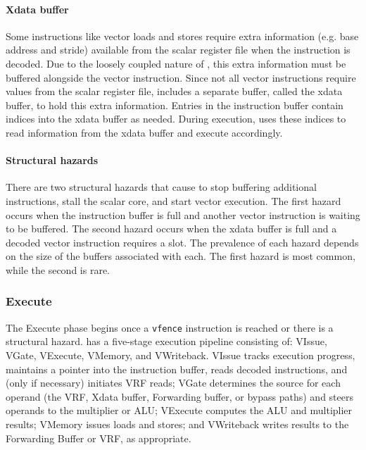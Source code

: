\paragraph{Xdata buffer}
Some instructions like vector loads and stores require extra information 
(e.g. base address and stride) available from the scalar register file when the instruction is decoded.
%
Due to the loosely coupled nature of \manic, this extra information must be buffered 
alongside the vector instruction.
%
Since not all vector instructions require values from the scalar register file, 
\manic includes a separate buffer, called the xdata buffer, to hold this extra
information.
%
Entries in the instruction buffer contain indices into the xdata buffer as needed.
%
During execution, \manic uses these indices to read information from the xdata buffer and execute accordingly.

\paragraph{Structural hazards}
There are two structural hazards that cause \manic to stop buffering additional
instructions, stall the scalar core, and start vector execution. 
%
The first hazard occurs when the instruction buffer is full and another vector instruction is waiting to be buffered.
%
The second hazard occurs when the xdata buffer is full and a decoded 
vector instruction requires a slot.
%
The prevalence of each hazard depends on the size of the buffers associated with each.
%
The first hazard is most common, while the second is rare.

\subsubsection{Execute}
The Execute phase begins once a {\tt vfence} instruction is reached or there is a structural hazard.
% 
\manic has a five-stage execution pipeline consisting of: VIssue, VGate, VExecute, VMemory, and VWriteback.
% 
VIssue tracks execution progress, maintains a pointer into the instruction buffer, reads decoded instructions, and (only if necessary) initiates VRF reads;
VGate determines the source for each operand (the VRF, Xdata buffer, Forwarding buffer, or bypass paths) and steers operands to the multiplier or ALU;
VExecute computes the ALU and multiplier results;
VMemory issues loads and stores;
and VWriteback writes results to the Forwarding Buffer or VRF, as appropriate.

